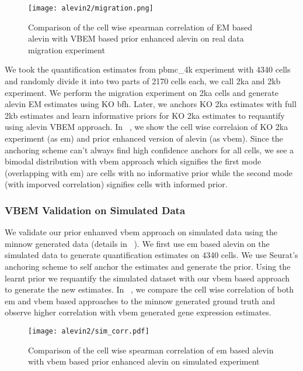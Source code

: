   \begin{figure}[!htb]
      \centering
    \texttt{[image: alevin2/migration.png]}
    \caption{ Comparison of the cell wise spearman correlation of EM based alevin with VBEM based
	prior enhanced alevin on real data migration experiment}
    \label{fig:alv2_real_val}
  \end{figure}

We took the quantification estimates from pbmc\_4k experiment with 4340 cells and randomly divide it into
two parts of 2170 cells each, we call 2ka and 2kb experiment. We perform the migration experiment on
2ka cells and generate alevin EM estimates using KO bfh. Later, we anchors KO 2ka estimates 
with full 2kb estimates and learn informative priors for KO 2ka estimates to requantify using alevin VBEM
approach. In ~, we show the cell wise correlaion of KO 2ka experiment (as em) and prior
enhanced version of alevin (as vbem). Since the anchoring scheme can't always find high confidence anchors for 
all cells, we see a bimodal distribution with vbem approach which signifies the first mode (overlapping 
with em) are cells with no informative prior while the second mode (with imporved correlation)
signifies cells with informed prior.

\subsubsection{VBEM Validation on Simulated Data}
We validate our prior enhanved vbem approach on simulated data using the minnow generated data (details in
~). We first use em based alevin on the simulated data to generate quantification
estimates on 4340 cells. We use Seurat's anchoring scheme to self anchor the estimates and generate the
prior. Using the learnt prior we requantify the simulated dataset with our vbem based approach to generate 
the new estimates. In ~, we compare the cell wise correlation of both em and vbem
based approaches to the minnow generated ground truth and observe higher correlation with vbem generated
gene expression estimates.

  \begin{figure}[!htb]
      \centering
    \texttt{[image: alevin2/sim\_corr.pdf]}
    \caption{ Comparison of the cell wise spearman correlation of em based alevin with vbem based
	prior enhanced alevin on simulated experiment}
    \label{fig:alv2_sim_val}
  \end{figure}


